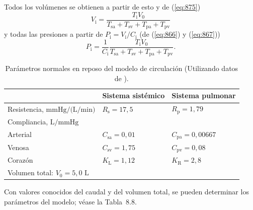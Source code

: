 \documentclass[12pt]{book}
\begin{document}
Todos los volúmenes se obtienen a partir de esto y de (\ref{eq:875})
\begin{equation}
V_{\text{i}} = \frac{T_{\text{i}} V_0}{T_{\text{sa}} + T_{\text{sv}} + T_{\text{pa}} + T_{\text{pv}}}
\label{eq:881}
\end{equation}
y todas las presiones a partir de $P_{\text{i}} = V_{\text{i}}/C_{\text{i}}$ (de (\ref{eq:866}) y (\ref{eq:867}))
\begin{equation}
P_{\text{i}} = \frac{1}{C_{\text{i}}} \frac{T_{\text{i}} V_0}{T_{\text{sa}} + T_{\text{sv}} + T_{\text{pa}} + T_{\text{pv}}}.
\label{eq:882}
\end{equation}

\begin{table}[htbp]
\centering
\caption{Parámetros normales en reposo del modelo de circulación (Utilizando datos de \cite{34}).}
\label{tab:88}
\begin{tabularx}{\textwidth}{lXX}
\toprule
 & Sistema sistémico & Sistema pulmonar \\
\midrule
Resistencia, $\text{mmHg/(L/min)}$ & $R_{\text{s}} = 17{,}5$ & $R_{\text{p}} = 1{,}79$ \\
Compliancia, $\text{L/mmHg}$ & & \\
\quad Arterial & $C_{\text{sa}} = 0{,}01$ & $C_{\text{pa}} = 0{,}00667$ \\
\quad Venosa & $C_{\text{sv}} = 1{,}75$ & $C_{\text{pv}} = 0{,}08$ \\
Corazón & $K_{\text{L}} = 1{,}12$ & $K_{\text{R}} = 2{,}8$ \\
\midrule
\multicolumn{3}{l}{Volumen total: $V_0 = 5{,}0\text{ L}$} \\
\bottomrule
\end{tabularx}
\end{table}

Con valores conocidos del caudal y del volumen total, se pueden determinar los parámetros del modelo; véase la Tabla~8.8.
\end{document}
